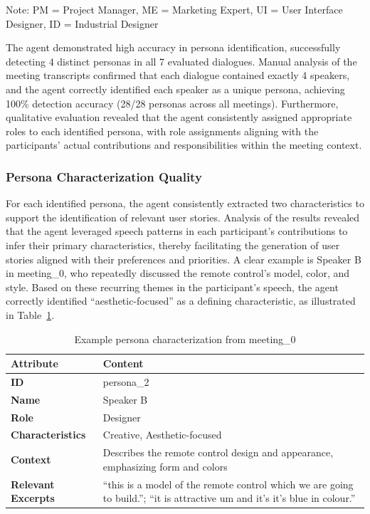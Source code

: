 \documentclass[12pt]{article}
\begin{document}
Note: PM = Project Manager, ME = Marketing Expert, UI = User Interface Designer, ID = Industrial Designer

The agent demonstrated high accuracy in persona identification, successfully detecting 4 distinct personas in all 7 evaluated dialogues. Manual analysis of the meeting transcripts confirmed that each dialogue contained exactly 4 speakers, and the agent correctly identified each speaker as a unique persona, achieving 100\% detection accuracy (28/28 personas across all meetings). Furthermore, qualitative evaluation revealed that the agent consistently assigned appropriate roles to each identified persona, with role assignments aligning with the participants' actual contributions and responsibilities within the meeting context.

\subsubsection{Persona Characterization Quality}

For each identified persona, the agent consistently extracted two characteristics to support the identification of relevant user stories. Analysis of the results revealed that the agent leveraged speech patterns in each participant's contributions to infer their primary characteristics, thereby facilitating the generation of user stories aligned with their preferences and priorities. A clear example is Speaker B in meeting\_0, who repeatedly discussed the remote control's model, color, and style. Based on these recurring themes in the participant's speech, the agent correctly identified ``aesthetic-focused'' as a defining characteristic, as illustrated in Table~\ref{tab:persona_example}.

\begin{table}[htb]
\centering
\caption{Example persona characterization from meeting\_0}
\label{tab:persona_example}
\begin{tabular}{p{3cm}p{8cm}}
\toprule
\textbf{Attribute} & \textbf{Content} \\
\midrule
\textbf{ID} & persona\_2 \\
\textbf{Name} & Speaker B \\
\textbf{Role} & Designer \\
\textbf{Characteristics} & Creative, Aesthetic-focused \\
\textbf{Context} & Describes the remote control design and appearance, emphasizing form and colors \\
\textbf{Relevant Excerpts} & ``this is a model of the remote control which we are going to build.''; ``it is attractive um and it's it's blue in colour.'' \\
\bottomrule
\end{tabular}
\end{table}
\end{document}
